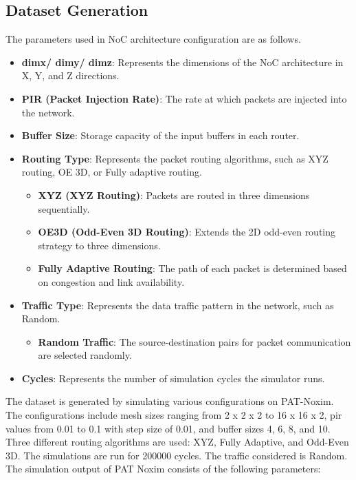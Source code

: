 \documentclass[conference]{IEEEtran}
\begin{document}
	\subsection{Dataset Generation}
	The parameters used in NoC architecture configuration are as follows.
	\begin{itemize}
		\item \textbf{dimx/ dimy/ dimz}: Represents the dimensions of the NoC architecture in X, Y, and Z directions.
		\item \textbf{PIR (Packet Injection Rate)}: The rate at which packets are injected into the network.
		\item \textbf{Buffer Size}: Storage capacity of the input buffers in each router.
		\item \textbf{Routing Type}: Represents the packet routing algorithms, such as XYZ routing, OE 3D, or Fully adaptive routing.
		\begin{itemize}
			\item \textbf{XYZ (XYZ Routing)}:  Packets are routed in three dimensions sequentially.
			\item \textbf{OE3D (Odd-Even 3D Routing)}: Extends the 2D odd-even routing strategy to three dimensions.
			\item \textbf{Fully Adaptive Routing}: The path of each packet is determined based on congestion and link availability.
		\end{itemize}
		\item \textbf{Traffic Type}: Represents the data traffic pattern in the network, such as Random.
		\begin{itemize}
			\item \textbf{Random Traffic}: The source-destination pairs for packet communication are selected randomly.
		\end{itemize}
		\item \textbf{Cycles}: Represents the number of simulation cycles the simulator runs.
		
	\end{itemize}
	The dataset is generated by simulating various configurations on PAT-Noxim. The configurations include mesh sizes ranging from 2 x 2 x 2 to  16 x 16 x 2, pir values from 0.01 to 0.1 with step size of 0.01, and buffer sizes 4, 6, 8, and 10. Three different routing algorithms are used: XYZ, Fully Adaptive, and Odd-Even 3D. The simulations are run for 200000 cycles. The traffic considered is Random. \\
	The simulation output of PAT Noxim consists of the following parameters:
\end{document}
